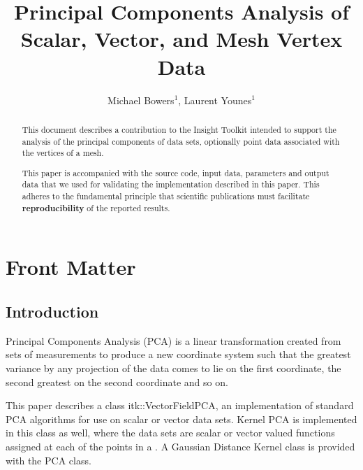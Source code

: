 \documentclass{InsightArticle}
\title{Principal Components Analysis of\\ Scalar, Vector, and Mesh Vertex Data}
\author{Michael Bowers$^{1}$, Laurent Younes$^{1}$}
\newcommand{\IJhandlerIDnumber}{XXXX}
\begin{document}
%
% 
\IJhandlefooter{\IJhandlerIDnumber}


\ifpdf
\else
\fi


\maketitle


\ifhtml
\chapter*{Front Matter\label{front}}
\fi


\begin{abstract}
\noindent
This document describes a contribution to the Insight Toolkit intended to
support the analysis of the principal components of data sets, optionally
point data associated with the vertices of a mesh.

This paper is accompanied with the source code, input data, parameters and
output data that we used for validating the implementation described in this
paper.  This adheres to the fundamental principle that scientific publications
must facilitate \textbf{reproducibility} of the reported results.
\end{abstract}

\tableofcontents

\section{Introduction}

Principal Components Analysis (PCA) is a linear transformation created from
sets of measurements to produce a new coordinate system such that the greatest
variance by any projection of the data comes to lie on the first coordinate,
the second greatest on the second coordinate and so on. 

This paper describes a class itk::VectorFieldPCA, an implementation of standard
PCA algorithms for use on
scalar or vector data sets.  Kernel PCA is implemented in this class as well,
where the data sets are scalar or vector valued functions assigned at each of
the points in a .  A Gaussian Distance Kernel class is provided
with the PCA class.
\end{document}
